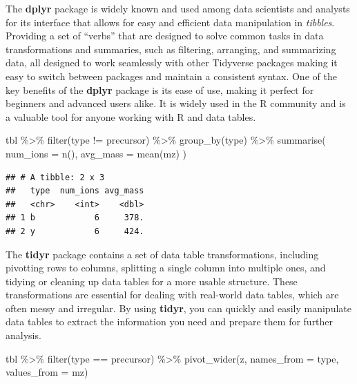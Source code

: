 \documentclass[
]{book}
\newenvironment{Shaded}{\begin{snugshade}}{\end{snugshade}}
\newcommand{\AttributeTok}[1]{\textcolor[rgb]{0.77,0.63,0.00}{#1}}
\newcommand{\FunctionTok}[1]{\textcolor[rgb]{0.00,0.00,0.00}{#1}}
\newcommand{\NormalTok}[1]{#1}
\newcommand{\SpecialCharTok}[1]{\textcolor[rgb]{0.00,0.00,0.00}{#1}}
\newcommand{\StringTok}[1]{\textcolor[rgb]{0.31,0.60,0.02}{#1}}
\begin{document}
The \textbf{dplyr} package is widely known and used among data scientists and analysts for its interface that allows for easy and efficient data manipulation in \emph{tibbles}. Providing a set of ``verbs'' that are designed to solve common tasks in data transformations and summaries, such as filtering, arranging, and summarizing data, all designed to work seamlessly with other Tidyverse packages making it easy to switch between packages and maintain a consistent syntax. One of the key benefits of the \textbf{dplyr} package is its ease of use, making it perfect for beginners and advanced users alike. It is widely used in the R community and is a valuable tool for anyone working with R and data tables.

\begin{Shaded}
\begin{Highlighting}[]
\NormalTok{tbl }\SpecialCharTok{\%\textgreater{}\%} 
  \FunctionTok{filter}\NormalTok{(type }\SpecialCharTok{!=} \StringTok{\textquotesingle{}precursor\textquotesingle{}}\NormalTok{) }\SpecialCharTok{\%\textgreater{}\%} 
  \FunctionTok{group\_by}\NormalTok{(type) }\SpecialCharTok{\%\textgreater{}\%}
  \FunctionTok{summarise}\NormalTok{(}
    \AttributeTok{num\_ions =} \FunctionTok{n}\NormalTok{(),}
    \AttributeTok{avg\_mass =} \FunctionTok{mean}\NormalTok{(mz)}
\NormalTok{  )}
\end{Highlighting}
\end{Shaded}

\begin{verbatim}
## # A tibble: 2 x 3
##   type  num_ions avg_mass
##   <chr>    <int>    <dbl>
## 1 b            6     378.
## 2 y            6     424.
\end{verbatim}

The \textbf{tidyr} package contains a set of data table transformations, including pivotting rows to columns, splitting a single column into multiple ones, and tidying or cleaning up data tables for a more usable structure. These transformations are essential for dealing with real-world data tables, which are often messy and irregular. By using \textbf{tidyr}, you can quickly and easily manipulate data tables to extract the information you need and prepare them for further analysis.

\begin{Shaded}
\begin{Highlighting}[]
\NormalTok{tbl }\SpecialCharTok{\%\textgreater{}\%} 
  \FunctionTok{filter}\NormalTok{(type }\SpecialCharTok{==} \StringTok{\textquotesingle{}precursor\textquotesingle{}}\NormalTok{) }\SpecialCharTok{\%\textgreater{}\%} 
  \FunctionTok{pivot\_wider}\NormalTok{(z, }\AttributeTok{names\_from =} \StringTok{\textquotesingle{}type\textquotesingle{}}\NormalTok{, }\AttributeTok{values\_from =} \StringTok{\textquotesingle{}mz\textquotesingle{}}\NormalTok{)}
\end{Highlighting}
\end{Shaded}
\end{document}
